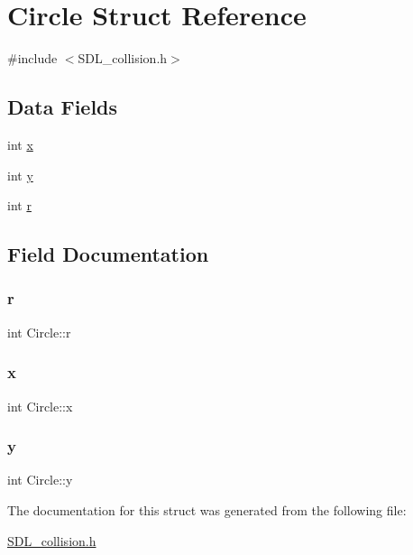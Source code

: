 \hypertarget{structCircle}{}\section{Circle Struct Reference}
\label{structCircle}


{\ttfamily \#include $<$S\+D\+L\+\_\+collision.\+h$>$}

\subsection*{Data Fields}
\begin{DoxyCompactItemize}
\item 
int \mbox{\hyperlink{structCircle_abceecd15b990054ddc30441cfcbb205d}{x}}
\item 
int \mbox{\hyperlink{structCircle_a78aef28b3c176d14e8d25f8cd84e7dfd}{y}}
\item 
int \mbox{\hyperlink{structCircle_a067c0b8ccbda5ca1f518dd89a1d55989}{r}}
\end{DoxyCompactItemize}


\subsection{Field Documentation}
\mbox{\label{structCircle_a067c0b8ccbda5ca1f518dd89a1d55989}} 
\subsubsection{\texorpdfstring{r}{r}}
{\footnotesize\ttfamily int Circle\+::r}

\mbox{\label{structCircle_abceecd15b990054ddc30441cfcbb205d}} 
\subsubsection{\texorpdfstring{x}{x}}
{\footnotesize\ttfamily int Circle\+::x}

\mbox{\label{structCircle_a78aef28b3c176d14e8d25f8cd84e7dfd}} 
\subsubsection{\texorpdfstring{y}{y}}
{\footnotesize\ttfamily int Circle\+::y}



The documentation for this struct was generated from the following file\+:\begin{DoxyCompactItemize}
\item 
\mbox{\hyperlink{SDL__collision_8h}{S\+D\+L\+\_\+collision.\+h}}\end{DoxyCompactItemize}
